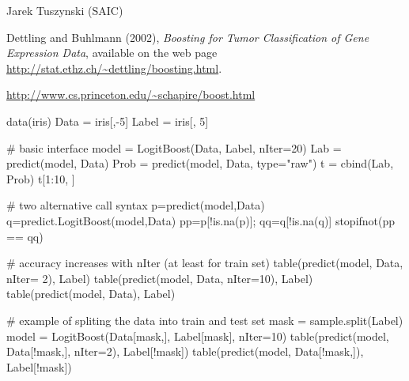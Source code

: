 \begin{Author}\relax
Jarek Tuszynski (SAIC) 
\end{Author}
\begin{References}\relax
Dettling and Buhlmann (2002), \emph{Boosting for Tumor Classification of Gene 
Expression Data}, available on the web page 
\url{http://stat.ethz.ch/~dettling/boosting.html}. 

\url{http://www.cs.princeton.edu/~schapire/boost.html}
\end{References}
\begin{SeeAlso}\relax
{}
\end{SeeAlso}
\begin{Examples}
\begin{ExampleCode}
  data(iris)
  Data  = iris[,-5]
  Label = iris[, 5]
  
  # basic interface
  model = LogitBoost(Data, Label, nIter=20)
  Lab   = predict(model, Data)
  Prob  = predict(model, Data, type="raw")
  t     = cbind(Lab, Prob)
  t[1:10, ]

  # two alternative call syntax
  p=predict(model,Data)
  q=predict.LogitBoost(model,Data)
  pp=p[!is.na(p)]; qq=q[!is.na(q)]
  stopifnot(pp == qq)

  # accuracy increases with nIter (at least for train set)
  table(predict(model, Data, nIter= 2), Label)
  table(predict(model, Data, nIter=10), Label)
  table(predict(model, Data),           Label)
  
  # example of spliting the data into train and test set
  mask = sample.split(Label)
  model = LogitBoost(Data[mask,], Label[mask], nIter=10)
  table(predict(model, Data[!mask,], nIter=2), Label[!mask])
  table(predict(model, Data[!mask,]),          Label[!mask])
\end{ExampleCode}
\end{Examples}

